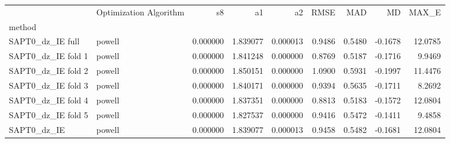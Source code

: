 \begin{tabular}{llrrrrrrr}
 & Optimization Algorithm & s8 & a1 & a2 & RMSE & MAD & MD & MAX_E \\
method &  &  &  &  &  &  &  &  \\
SAPT0_dz_IE full & powell & 0.000000 & 1.839077 & 0.000013 & 0.9486 & 0.5480 & -0.1678 & 12.0785 \\
SAPT0_dz_IE fold 1 & powell & 0.000000 & 1.841248 & 0.000000 & 0.8769 & 0.5187 & -0.1716 & 9.9469 \\
SAPT0_dz_IE fold 2 & powell & 0.000000 & 1.850151 & 0.000000 & 1.0900 & 0.5931 & -0.1997 & 11.4476 \\
SAPT0_dz_IE fold 3 & powell & 0.000000 & 1.840171 & 0.000000 & 0.9394 & 0.5635 & -0.1711 & 8.2692 \\
SAPT0_dz_IE fold 4 & powell & 0.000000 & 1.837351 & 0.000000 & 0.8813 & 0.5183 & -0.1572 & 12.0804 \\
SAPT0_dz_IE fold 5 & powell & 0.000000 & 1.827537 & 0.000000 & 0.9416 & 0.5472 & -0.1411 & 9.4858 \\
SAPT0_dz_IE & powell & 0.000000 & 1.839077 & 0.000013 & 0.9458 & 0.5482 & -0.1681 & 12.0804 \\
\end{tabular}
